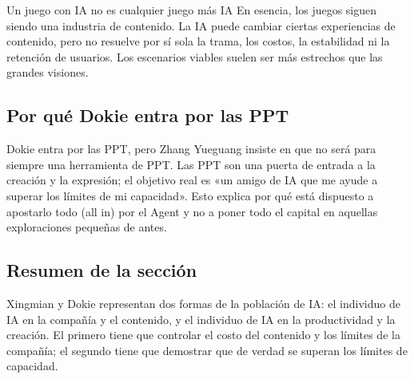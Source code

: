 \begin{warningbox}{Un juego con IA no es cualquier juego más IA}
En esencia, los juegos siguen siendo una industria de contenido. La IA puede cambiar ciertas experiencias de contenido, pero no resuelve por sí sola la trama, los costos, la estabilidad ni la retención de usuarios. Los escenarios viables suelen ser más estrechos que las grandes visiones.
\end{warningbox}

\subsection{Por qué Dokie entra por las PPT}

Dokie entra por las PPT, pero Zhang Yueguang insiste en que no será para siempre una herramienta de PPT. Las PPT son una puerta de entrada a la creación y la expresión; el objetivo real es «un amigo de IA que me ayude a superar los límites de mi capacidad». Esto explica por qué está dispuesto a apostarlo todo (all in) por el Agent y no a poner todo el capital en aquellas exploraciones pequeñas de antes.

\subsection{Resumen de la sección}

Xingmian y Dokie representan dos formas de la población de IA: el individuo de IA en la compañía y el contenido, y el individuo de IA en la productividad y la creación. El primero tiene que controlar el costo del contenido y los límites de la compañía; el segundo tiene que demostrar que de verdad se superan los límites de capacidad.
